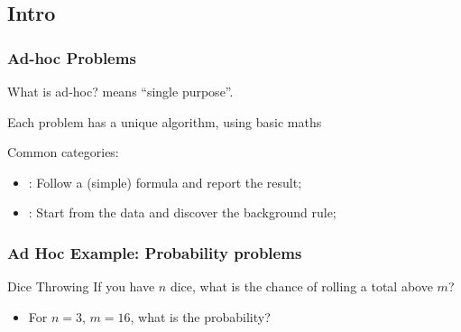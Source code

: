 \documentclass{beamer}
\begin{document}
\subsection{Intro}
\begin{frame}
  \frametitle{Ad-hoc Problems}

  {\small
  \begin{block}{What is ad-hoc?}
     means ``single purpose''.

    \bigskip

    Each problem has a unique algorithm, using basic maths
  \end{block}

  \bigskip

  Common categories:
  \begin{itemize}
  \item {}: Follow a (simple) formula and report the result;
  \item {}: Start from the data and discover the
    background rule;
  \end{itemize}}
\end{frame}

\begin{frame}
  \frametitle{Ad Hoc Example: Probability problems}

  {\smaller
    \begin{block}{Dice Throwing}
      If you have $n$ dice, what is the chance of rolling a total above $m$?
    \end{block}

    \begin{itemize}
    \item {} For $n=3$, $m=16$, what is the probability?
    \end{itemize}
  }
\end{frame}
\end{document}
